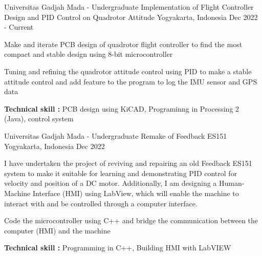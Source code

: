 

\begin{cventries}

  \cventry
    {Universitas Gadjah Mada - Undergraduate} %
    {Implementation of Flight Controller Design and PID Control on Quadrotor Attitude} %
    {Yogyakarta, Indonesia} %
    {Dec 2022 - Current} %
    {
      \begin{cvitems} %
        \item {Make and iterate PCB design of quadrotor flight controller to find the most compact and stable design using 8-bit microcontroller}
        \item {Tuning and refining the quadrotor attitude control using PID to make a stable attitude control and add feature to the program to log the IMU sensor and GPS data}
        \item {\textbf{Technical skill : } PCB design using KiCAD, Programinng in Processing 2 (Java),  control system}
      \end{cvitems}
    }
    
  \cventry
    {Universitas Gadjah Mada - Undergraduate} %
    {Remake of Feedback ES151} %
    {Yogyakarta, Indonesia} %
    {Dec 2022} %
    {
      \begin{cvitems} %
        \item{I have undertaken the project of reviving and repairing an old Feedback ES151 system to make it suitable for learning and demonstrating PID control for velocity and position of a DC motor. Additionally, I am designing a Human-Machine Interface (HMI) using LabView, which will enable the machine to interact with and be controlled through a computer interface.}
        \item{Code the microcontroller using C++ and bridge the communication between the computer (HMI) and the machine}
        \item{\textbf{Technical skill : } Programming in C++, Building HMI with LabVIEW}
      \end{cvitems}
    }
    

\end{cventries}
